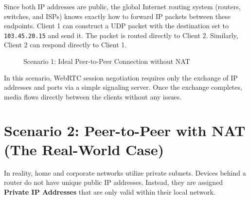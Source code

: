 \documentclass[11pt,a4paper]{article}
\begin{document}
Since both IP addresses are public, the global Internet routing system (routers, switches, and ISPs) knows exactly how to forward IP packets between these endpoints. Client 1 can construct a UDP packet with the destination set to \texttt{103.45.20.15} and send it. The packet is routed directly to Client 2. Similarly, Client 2 can respond directly to Client 1.

\begin{figure}[h!]
\centering
{}
\caption{Scenario 1: Ideal Peer-to-Peer Connection without NAT}
\label{fig:ideal_no_nat}
\end{figure}

In this scenario, WebRTC session negotiation requires only the exchange of IP addresses and ports via a simple signaling server. Once the exchange completes, media flows directly between the clients without any issues.

\newpage

\section{Scenario 2: Peer-to-Peer with NAT (The Real-World Case)}

In reality, home and corporate networks utilize private subnets. Devices behind a router do not have unique public IP addresses. Instead, they are assigned \textbf{Private IP Addresses} that are only valid within their local network.
\end{document}
